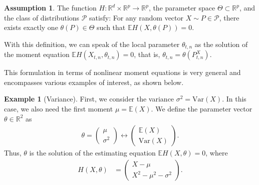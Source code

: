 \documentclass[12pt,a4paper]{article}
\theoremstyle{definition}
\newtheorem{assumption}{Assumption}[section]
\newtheorem{example}{Example}[section]
\theoremstyle{definition}
\theoremstyle{theorem}
\newcommand{\R}{\mathbb{R}}
\newcommand{\E}{\mathbb{E}}
\begin{document}
\begin{assumption}
    The function $H:\R^d\times \R^p\to \R^p$, the parameter space $\Theta\subset\R^p$, and the class of distributions $\mathcal{P}$ satisfy:  
    For any random vector $X\sim P\in\mathcal{P}$, there exists exactly one $\theta(P)\in\Theta$ such that $\E H(X,\theta(P))=0$.
\end{assumption}

With this definition, we can speak of the local parameter $\theta_{t,n}$ as the solution of the moment equation $\E H(X_{t,n},\theta_{t,n})=0$, that is, $\theta_{t,n}=\theta(P^X_{t,n})$.


This formulation in terms of nonlinear moment equations is very general and encompasses various examples of interest, as shown below.
\newpage
\begin{example}[Variance]
    First, we consider the variance $\sigma^2 = \mathrm{Var}(X)$. In this case, we also need the first moment $\mu = \E(X)$. 
    We define the parameter vector $\theta \in \R^2$ as 
    \begin{align*}
        \theta = \begin{pmatrix}
         \mu\\
         \sigma^2
    \end{pmatrix} \leftrightarrow 
    \begin{pmatrix}
            \E(X) \\ 
            \mathrm{Var}(X)
        \end{pmatrix}.
    \end{align*}
    Thus, $\theta$ is the solution of the estimating equation $\E H(X,\theta) = 0$, where 
    \begin{align*}
        H(X,\theta) &= \begin{pmatrix}
            X-\mu\\
            X^2 - \mu^2-\sigma^2
        \end{pmatrix}.
    \end{align*}
\end{example}
\end{document}
